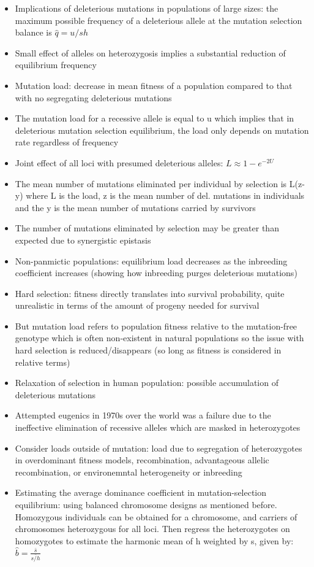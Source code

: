 \documentclass[12pt]{amsart}
\begin{document}
\begin{itemize}
\item Implications of deleterious mutations in populations of large sizes: the maximum possible frequency of a deleterious allele at the mutation selection balance is $\hat{q} = u/sh$ 
\item Small effect of alleles on heterozygosis implies a substantial reduction of equilibrium frequency
\item Mutation load: decrease in mean fitness of a population compared to that with no segregating deleterious mutations 
\item The mutation load for a recessive allele is equal to u which implies that in deleterious mutation selection equilibrium, the load only depends on mutation rate regardless of frequency
\item Joint effect of all loci with presumed deleterious alleles: $L \approx 1 - e^{-2U}$ 
\item The mean number of mutations eliminated per individual by selection is L(z-y) where L is the load, z is the mean number of del. mutations in individuals and the y is the mean number of mutations carried by survivors 
\item The number of mutations eliminated by selection may be greater than expected due to synergistic epistasis
\item Non-panmictic populations: equilibrium load decreases as the inbreeding coefficient increases (showing how inbreeding purges deleterious mutations)
\item Hard selection: fitness directly translates into survival probability, quite unrealistic in terms of the amount of progeny needed for survival
\item But mutation load refers to population fitness relative to the mutation-free genotype which is often non-existent in natural populations  so the issue with hard selection is reduced/disappears (so long as fitness is considered in relative terms)
\item Relaxation of selection in human population: possible accumulation of deleterious mutations
\item Attempted eugenics in 1970s over the world was a failure due to the ineffective elimination of recessive alleles which are masked in heterozygotes 
\item Consider loads outside of mutation: load due to segregation of heterozygotes in overdominant fitness models, recombination, advantageous allelic recombination, or environemntal heterogeneity or inbreeding
\item Estimating the average dominance coefficient in mutation-selection equilibrium: using balanced chromosome designs as mentioned before. Homozygous individuals can be obtained for a chromosome, and carriers of chromosomes heterozygous for all loci. Then regress the heterozygotes on homozygotes to estimate the harmonic mean of h weighted by s, given by: $\hat{b} =  \frac{\bar{s}}{\bar{s/h}}$

\end{itemize}
\end{document}
